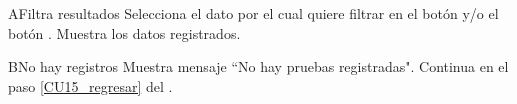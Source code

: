     \begin{UCtrayectoriaA}{A}{Filtra resultados}
    	\UCpaso[\UCactor] Selecciona el dato por el cual quiere filtrar en el botón  y/o el botón .
    	\UCpaso Muestra los datos registrados. 
    \end{UCtrayectoriaA}

	\begin{UCtrayectoriaA}{B}{No hay registros}
		\UCpaso Muestra mensaje “No hay pruebas registradas".
		\UCpaso Continua en el paso \ref{CU15_regresar} del .
	\end{UCtrayectoriaA}


	


